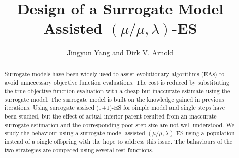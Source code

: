 \documentclass[sig-alternate,natbib=false]{acmart}
\begin{document}
\title{Design of a Surrogate Model Assisted $(\mu/\mu,\lambda)$-ES}

\

\author{Jingyun Yang and Dirk V. Arnold}
\orcid{}






\begin{abstract}
Surrogate models have been widely used to assist evolutionary algorithms (EAs) to avoid unnecessary objective function evaluations. The cost is reduced by substituting the true objective function evaluation with a cheap but inaccurate estimate using the surrogate model. The surrogate model is built on the knowledge gained in previous iterations. Using surrogate assised (1+1)-ES for simple model and single steps have been studied, but the effect of actual inferior parent resulted from an inaccurate surrogate estimation and the corresponding poor step size are not well understood. We study the behaviour using a surrogate model assisted $(\mu/\mu,\lambda)$-ES using a population instead of a single offspring with the hope to address this issue. The bahaviours of the two strategies are compared using several test functions.
\end{abstract}

%
%
\end{document}
